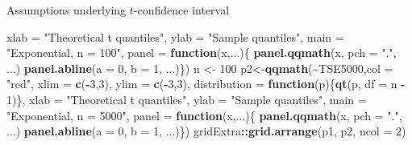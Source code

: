 \documentclass[
  ignorenonframetext,
]{beamer}
\newenvironment{Shaded}{\begin{snugshade}}{\end{snugshade}}
\newcommand{\AttributeTok}[1]{\textcolor[rgb]{0.13,0.29,0.53}{#1}}
\newcommand{\ControlFlowTok}[1]{\textcolor[rgb]{0.13,0.29,0.53}{\textbf{#1}}}
\newcommand{\DecValTok}[1]{\textcolor[rgb]{0.00,0.00,0.81}{#1}}
\newcommand{\FunctionTok}[1]{\textcolor[rgb]{0.13,0.29,0.53}{\textbf{#1}}}
\newcommand{\NormalTok}[1]{#1}
\newcommand{\OtherTok}[1]{\textcolor[rgb]{0.56,0.35,0.01}{#1}}
\newcommand{\SpecialCharTok}[1]{\textcolor[rgb]{0.81,0.36,0.00}{\textbf{#1}}}
\newcommand{\StringTok}[1]{\textcolor[rgb]{0.31,0.60,0.02}{#1}}
\begin{document}
\begin{frame}[fragile]{Assumptions underlying \(t\)-confidence interval}
\begin{Shaded}
\begin{Highlighting}[]
       \AttributeTok{xlab =} \StringTok{"Theoretical t quantiles"}\NormalTok{, }\AttributeTok{ylab =} \StringTok{"Sample quantiles"}\NormalTok{, }\AttributeTok{main =} \StringTok{"Exponential, n = 100"}\NormalTok{, }
       \AttributeTok{panel =} \ControlFlowTok{function}\NormalTok{(x,...)\{}
  \FunctionTok{panel.qqmath}\NormalTok{(x, }\AttributeTok{pch =} \StringTok{"."}\NormalTok{, ...)}
  \FunctionTok{panel.abline}\NormalTok{(}\AttributeTok{a =} \DecValTok{0}\NormalTok{, }\AttributeTok{b =} \DecValTok{1}\NormalTok{, ...)\})}
\NormalTok{n }\OtherTok{\textless{}{-}} \DecValTok{100}
\NormalTok{p2}\OtherTok{\textless{}{-}}\FunctionTok{qqmath}\NormalTok{(}\SpecialCharTok{\textasciitilde{}}\NormalTok{TSE5000,}\AttributeTok{col =} \StringTok{"red"}\NormalTok{, }\AttributeTok{xlim =} \FunctionTok{c}\NormalTok{(}\SpecialCharTok{{-}}\DecValTok{3}\NormalTok{,}\DecValTok{3}\NormalTok{), }\AttributeTok{ylim =} \FunctionTok{c}\NormalTok{(}\SpecialCharTok{{-}}\DecValTok{3}\NormalTok{,}\DecValTok{3}\NormalTok{), }\AttributeTok{distribution =} \ControlFlowTok{function}\NormalTok{(p)\{}\FunctionTok{qt}\NormalTok{(p, }\AttributeTok{df =}\NormalTok{ n }\SpecialCharTok{{-}} \DecValTok{1}\NormalTok{)\}, }
       \AttributeTok{xlab =} \StringTok{"Theoretical t quantiles"}\NormalTok{, }\AttributeTok{ylab =} \StringTok{"Sample quantiles"}\NormalTok{, }\AttributeTok{main =} \StringTok{"Exponential, n = 5000"}\NormalTok{, }
       \AttributeTok{panel =} \ControlFlowTok{function}\NormalTok{(x,...)\{}
  \FunctionTok{panel.qqmath}\NormalTok{(x, }\AttributeTok{pch =} \StringTok{"."}\NormalTok{, ...)}
  \FunctionTok{panel.abline}\NormalTok{(}\AttributeTok{a =} \DecValTok{0}\NormalTok{, }\AttributeTok{b =} \DecValTok{1}\NormalTok{, ...)\})}
\NormalTok{gridExtra}\SpecialCharTok{::}\FunctionTok{grid.arrange}\NormalTok{(p1, p2, }\AttributeTok{ncol =} \DecValTok{2}\NormalTok{)}
\end{Highlighting}
\end{Shaded}

\normalsize
\end{frame}
\end{document}
